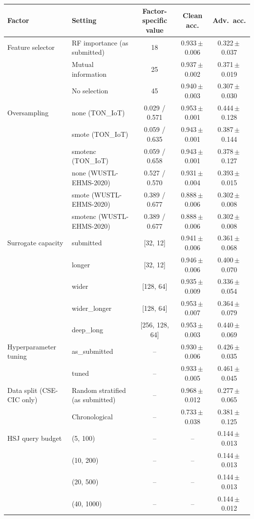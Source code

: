 \begin{tabular}{l l c c c}
\toprule
\textbf{Factor} & \textbf{Setting} & \textbf{Factor-specific value} & \textbf{Clean acc.} & \textbf{Adv.\ acc.} \\
\midrule
Feature selector & RF importance (as submitted) & 18 & 0.933\,$\pm$\,0.006 & 0.322\,$\pm$\,0.037 \\
 & Mutual information & 25 & 0.937\,$\pm$\,0.002 & 0.371\,$\pm$\,0.019 \\
 & No selection & 45 & 0.940\,$\pm$\,0.003 & 0.307\,$\pm$\,0.030 \\
\midrule
Oversampling & none (TON\_IoT) & 0.029 / 0.571 & 0.953\,$\pm$\,0.001 & 0.444\,$\pm$\,0.128 \\
 & smote (TON\_IoT) & 0.059 / 0.635 & 0.943\,$\pm$\,0.001 & 0.387\,$\pm$\,0.144 \\
 & smotenc (TON\_IoT) & 0.059 / 0.658 & 0.943\,$\pm$\,0.001 & 0.378\,$\pm$\,0.127 \\
 & none (WUSTL-EHMS-2020) & 0.527 / 0.570 & 0.931\,$\pm$\,0.004 & 0.393\,$\pm$\,0.015 \\
 & smote (WUSTL-EHMS-2020) & 0.389 / 0.677 & 0.888\,$\pm$\,0.006 & 0.302\,$\pm$\,0.008 \\
 & smotenc (WUSTL-EHMS-2020) & 0.389 / 0.677 & 0.888\,$\pm$\,0.006 & 0.302\,$\pm$\,0.008 \\
\midrule
Surrogate capacity & submitted & [32, 12] & 0.941\,$\pm$\,0.006 & 0.361\,$\pm$\,0.068 \\
 & longer & [32, 12] & 0.946\,$\pm$\,0.006 & 0.400\,$\pm$\,0.070 \\
 & wider & [128, 64] & 0.935\,$\pm$\,0.009 & 0.336\,$\pm$\,0.054 \\
 & wider\_longer & [128, 64] & 0.953\,$\pm$\,0.007 & 0.364\,$\pm$\,0.079 \\
 & deep\_long & [256, 128, 64] & 0.953\,$\pm$\,0.003 & 0.440\,$\pm$\,0.069 \\
\midrule
Hyperparameter tuning & as\_submitted & -- & 0.930\,$\pm$\,0.006 & 0.426\,$\pm$\,0.035 \\
 & tuned & -- & 0.933\,$\pm$\,0.005 & 0.461\,$\pm$\,0.045 \\
\midrule
Data split (CSE-CIC only) & Random stratified (as submitted) & -- & 0.968\,$\pm$\,0.012 & 0.277\,$\pm$\,0.065 \\
 & Chronological & -- & 0.733\,$\pm$\,0.038 & 0.381\,$\pm$\,0.125 \\
\midrule
HSJ query budget & (5, 100) & -- & -- & 0.144\,$\pm$\,0.013 \\
 & (10, 200) & -- & -- & 0.144\,$\pm$\,0.013 \\
 & (20, 500) & -- & -- & 0.144\,$\pm$\,0.013 \\
 & (40, 1000) & -- & -- & 0.144\,$\pm$\,0.012 \\
\bottomrule
\end{tabular}
